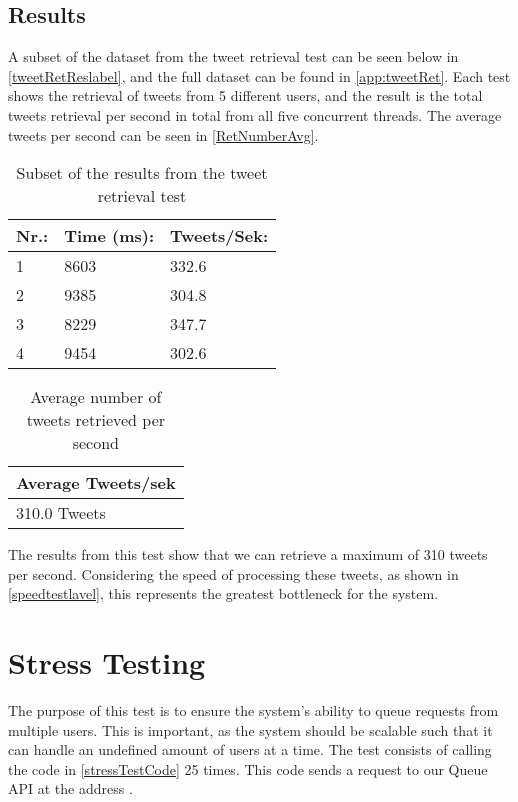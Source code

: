 \subsection*{Results}
A subset of the dataset from the tweet retrieval test can be seen below in
\autoref{tweetRetReslabel}, and the full dataset can be found in
\autoref{app:tweetRet}.
Each test shows the retrieval of tweets from 5 different users, and the result is the total tweets retrieval per second in
total from all five concurrent threads. The average tweets per second can be
seen in \autoref{RetNumberAvg}. 

\begin{table}[H]\centering
\begin{tabular}{|l|l|l|}
\hline
\textbf{Nr.:}	&	\textbf{Time (ms):}	&	\textbf{Tweets/Sek:} \\\hline
1	&	8603	&	332.6\\\hline
2	&	9385	&	304.8\\\hline
3	&	8229	&	347.7\\\hline
4	&	9454	&	302.6\\\hline
\end{tabular}
\caption{Subset of the results from the tweet retrieval test}
\label{tweetRetReslabel}
\end{table}

\begin{table}[H]\centering
\begin{tabular}{|l|}\hline
\textbf{Average Tweets/sek}	\\\hline
310.0 Tweets \\\hline
\end{tabular}
\caption{Average number of tweets retrieved per second}
\label{RetNumberAvg}
\end{table}

The results from this test show that we can retrieve a maximum of 310 tweets per
second. Considering the speed of processing these tweets, as shown in
\autoref{speedtestlavel}, this represents the greatest bottleneck for the
system.
 




\section{Stress Testing}
The purpose of this test is to ensure the system's ability to queue requests
from multiple users. This is important, as the system should be scalable such
that it can handle an undefined amount of users at a time. The test consists of
calling the code in \autoref{stressTestCode} 25 times. This code sends a request
to our Queue API at the address .\nl


